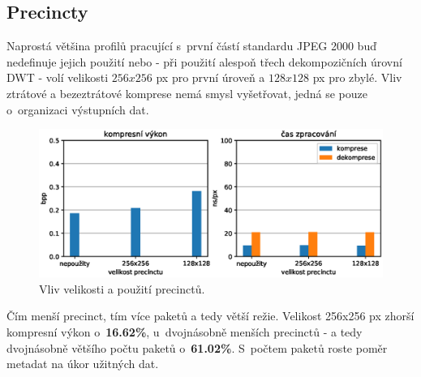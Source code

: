 %
%
\subsection*{Precincty}
Naprostá většina profilů pracující s~první částí standardu JPEG 2000 buď nedefinuje jejich použití nebo - při použití alespoň třech dekompozičních úrovní DWT - volí velikosti $256x256$ px pro první úroveň a $128x128$ px pro zbylé. Vliv ztrátové a bezeztrátové komprese nemá smysl vyšetřovat, jedná se pouze o~organizaci výstupních dat.

\begin{figure}[hbt!]
  \centering
  \hspace*{-0.75cm}
  \includegraphics[width=16cm]{obrazky-figures/prec/fotky_prec.eps}
  \caption{Vliv velikosti a použití precinctů.}
\end{figure}

\noindent Čím menší precinct, tím více paketů a tedy větší režie. Velikost 256x256 px zhorší kompresní výkon o~\textbf{16.62\%}, u~dvojnásobně menších precinctů - a tedy dvojnásobně většího počtu paketů o~\textbf{61.02\%}. S~počtem paketů roste poměr metadat na úkor užitných dat.
\clearpage

%
%
